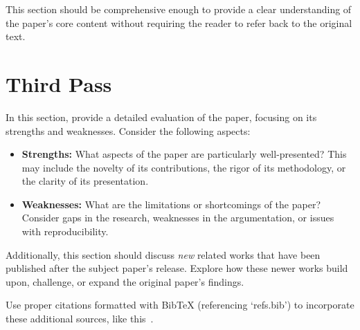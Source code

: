 \documentclass{article}
\begin{document}
This section should be comprehensive enough to provide a clear understanding of the paper's core content without requiring the reader to refer back to the original text.

\section{Third Pass}
In this section, provide a detailed evaluation of the paper, focusing on its strengths and weaknesses. Consider the following aspects:

\begin{itemize}
    \item \textbf{Strengths:} What aspects of the paper are particularly well-presented? This may include the novelty of its contributions, the rigor of its methodology, or the clarity of its presentation.
    \item \textbf{Weaknesses:} What are the limitations or shortcomings of the paper? Consider gaps in the research, weaknesses in the argumentation, or issues with reproducibility.
\end{itemize}

Additionally, this section should discuss \textit{new} related works that have been published after the subject paper’s release. Explore how these newer works build upon, challenge, or expand the original paper's findings. 

Use proper citations formatted with BibTeX (referencing `refs.bib') to incorporate these additional sources, like this~\cite{how_to_read_a_paper}.


\printbibliography
\end{document}
